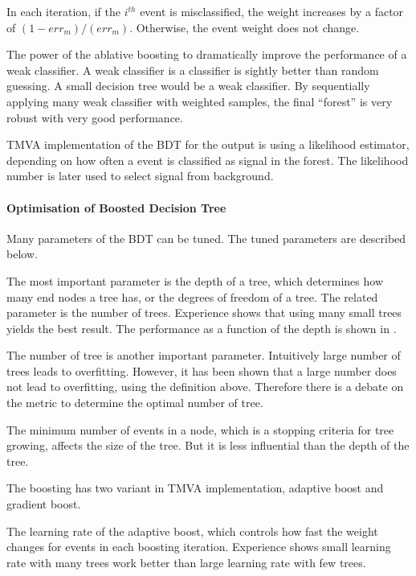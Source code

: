 In each iteration, if the $i^{th}$ event is misclassified, the weight increases by a factor of $(1 - err_m)/(err_m)$. Otherwise, the event weight does not change.

The power of the ablative boosting to dramatically improve the performance of a weak classifier. A weak classifier is a classifier is sightly better than random guessing. A small decision tree would be a weak classifier. By sequentially applying many weak classifier with weighted samples, the final ``forest'' is very robust with very good performance.


TMVA implementation of the BDT for the output is using a likelihood estimator, depending on how often a event is classified as signal in the forest. The likelihood number is later used to select signal from background.

\paragraph{Optimisation of Boosted Decision Tree}
\label{sec:pandoraMVAbdtVar}
Many parameters of the BDT can be tuned. The tuned parameters are described below.

The most important parameter is the depth of a tree, which determines how many end nodes a tree has, or the degrees of freedom of a tree. The related parameter is the number of trees. Experience shows that using many small trees yields the best result. The performance as a function of the depth is shown in .

The number of tree is another important parameter. Intuitively large number of trees leads to overfitting. However, it has been shown that a large number does not lead to overfitting, using the definition above. Therefore there is a debate on the metric to determine the optimal number of tree.

The minimum number of events in a node, which is a stopping criteria for tree growing, affects the size of the tree. But it is less influential than the depth of the tree.

The boosting has two variant in TMVA implementation, adaptive boost and gradient boost.

The learning rate of the adaptive boost, which controls how fast the weight changes for events in each boosting iteration. Experience shows small learning rate with many trees work better than large learning rate with few trees.

